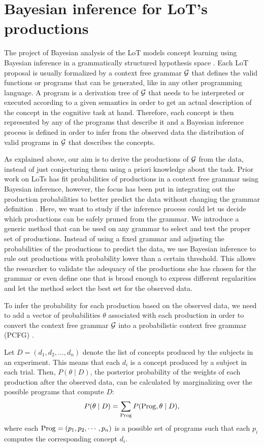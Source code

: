 \section{Bayesian inference for LoT's productions}

The project of Bayesian analysis of the LoT models concept learning using Bayesian inference in a grammatically structured hypothesis space \cite{goodman2008rational}. Each LoT proposal is usually formalized by a context free grammar $\gram$ that defines the valid functions or programs that can be generated, like in any other programming language. A program is a derivation tree of $\gram$ that needs to be interpreted or executed according to a given semantics in order to get an actual description of the concept in the cognitive task at hand. Therefore, each concept is then represented by any of the programs that describe it and a Bayesian inference process is defined in order to infer from the observed data the distribution of valid programs in $\gram$ that describes the concepts.

As explained above, our aim is to derive the productions of $\gram$ from the data, instead of just conjecturing them using a priori knowledge about the task. Prior work on LoTs has fit probabilities of productions in a context free grammar using Bayesian inference, however, the focus has been put in integrating out the production probabilities to better predict the data without changing the grammar definition \cite{piantadosi2016logical}. Here, we want to study if the inference process could let us decide which productions can be safely pruned from the grammar. We introduce a generic method that can be used on any grammar to select and test the proper set of productions. Instead of using a fixed grammar and adjusting the probabilities of the productions to predict the data, we use Bayesian inference to rule out productions with probability lower than a certain threshold. This allows the researcher to validate the adequacy of the productions she has chosen for the grammar or even define one that is broad enough to express different regularities and let the method select the best set for the observed data.


To infer the probability for each production based on the observed data, we need to add a vector of probabilities $\theta$ associated with each production in order to convert the context free grammar $\gram$ into a probabilistic context free grammar (PCFG) \cite{manning1999foundations}.

Let $D = (d_1, d_2, \dots, d_n)$ denote the list of concepts produced by the subjects in an experiment. This means that each $d_i$ is a concept produced by a subject in each trial. Then, $P(\theta \mid D)$, the posterior probability of the weights of each production after the observed data, can be calculated by marginalizing over the possible programs that compute $D$:
%
\begin{equation}
\label{eqA}
P(\theta \mid D) = \sum_{\Prog} P(\Prog,\theta \mid D),
\end{equation} where each $\Prog  = (p_1, p_2, \cdots, p_n)$ is a possible set of programs such that each $p_i$ computes the corresponding concept $d_i$.

